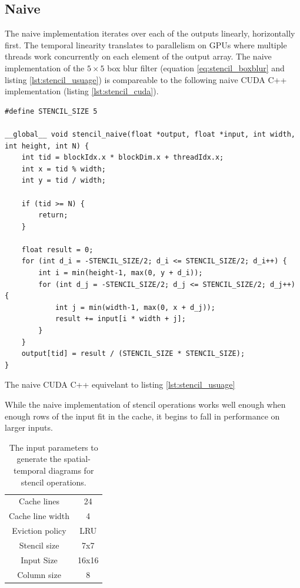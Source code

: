 \subsection{Naive}
\label{sec:stencil_naive}
The naive implementation iterates over each of the outputs linearly, horizontally first.
The temporal linearity translates to parallelism on GPUs where multiple threads work concurrently on each element of the output array.
The naive implementation of the $5 \times 5$ box blur filter (equation \ref{eq:stencil_boxblur} and listing \ref{lst:stencil_usuage}) is compareable to the following naive CUDA C++ implementation (listing \ref{lst:stencil_cuda}).

\begin{listing}[H]
    \begin{verbatim}
#define STENCIL_SIZE 5

__global__ void stencil_naive(float *output, float *input, int width, int height, int N) {
    int tid = blockIdx.x * blockDim.x + threadIdx.x;
    int x = tid % width;
    int y = tid / width;
    
    if (tid >= N) {
        return;
    }

    float result = 0;
    for (int d_i = -STENCIL_SIZE/2; d_i <= STENCIL_SIZE/2; d_i++) {
        int i = min(height-1, max(0, y + d_i));
        for (int d_j = -STENCIL_SIZE/2; d_j <= STENCIL_SIZE/2; d_j++) {
            int j = min(width-1, max(0, x + d_j));
            result += input[i * width + j];
        }
    }
    output[tid] = result / (STENCIL_SIZE * STENCIL_SIZE);
}
    \end{verbatim}
    \caption{
        The naive CUDA C++ equivelant to listing \ref{lst:stencil_usuage}
    }
    \label{lst:stencil_cuda}
\end{listing}

While the naive implementation of stencil operations works well enough when enough rows of the input fit in the cache, it begins to fall in performance on larger inputs.

\begin{table}[H]
    \centering
    \begin{tabular}{|c c|}
        \hline
        Cache lines      & 24   \\
        Cache line width & 4    \\
        Eviction policy  & LRU  \\
        \hline
        Stencil size     & 7x7  \\
        Input Size       & 16x16\\
        Column size      & 8    \\
        \hline
    \end{tabular}
    \caption{
        The input parameters to generate the spatial-temporal diagrams for stencil operations.
    }
    \label{tab:sim_stencil_params}
\end{table}

